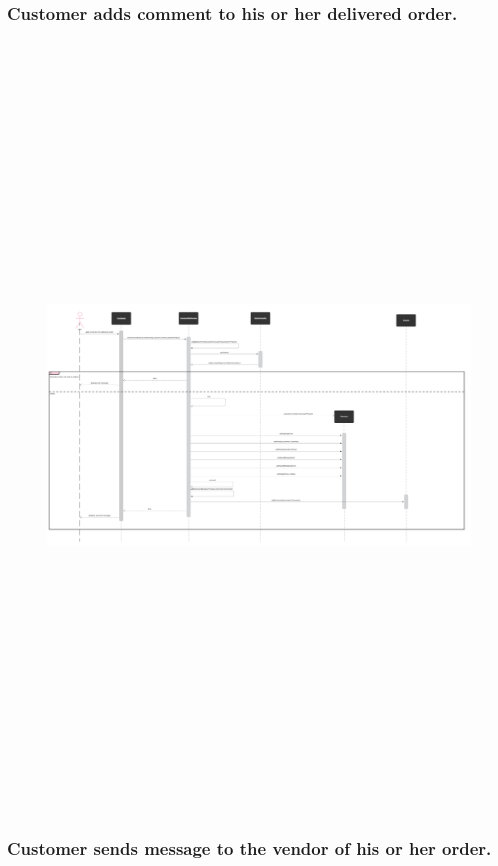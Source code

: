 \documentclass[]{article}
\begin{document}
\hypertarget{customer-adds-comment-to-his-or-her-delivered-order.}{%
    \subsubsection{Customer adds comment to his or her delivered
        order.}\label{customer-adds-comment-to-his-or-her-delivered-order.}}

\begin{figure}[H]
    \centering
    \includegraphics[height=8in]{./images/53.png}

\end{figure}

\hypertarget{customer-sends-message-to-the-vendor-of-his-or-her-order.}{%
    \subsubsection{Customer sends message to the vendor of his or her
        order.}\label{customer-sends-message-to-the-vendor-of-his-or-her-order.}}
\end{document}
